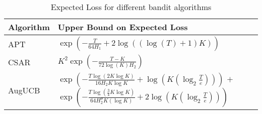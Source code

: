 \begin{table}
\caption{Expected Loss for different bandit algorithms}
\label{tab:regret-bds}
\begin{center}
\begin{tabular}{|p{1.3cm}|p{6.33cm}|}
\toprule
Algorithm  & Upper Bound on Expected Loss \\
\midrule
APT         &$\exp(-\frac{T}{64H_1}+2\log((\log(T)+1)K))$ \\\midrule
CSAR		&$K^2\exp(-\frac{T-K}{72\log(K)H_2})$ \\\midrule
AugUCB      &
$\exp\left( -\frac{T\log ( 2K\log K)}{ 16 H_2 K\log K} + \log\left(K\left(\log_2\frac{T}{e}\right)\right)\right)$\newline
 $+$\newline
 $ \exp\left(- \frac{T\log ( \frac{3}{4} K\log K)}{64H_{2}^{\sigma} K(\log K)}
 + 2\log\left(K\left(\log_2\frac{T}{e}\right)\right) \right) $
\\\bottomrule
\end{tabular}
\end{center}
\end{table}

  